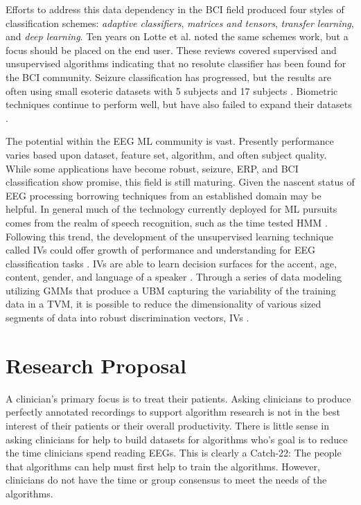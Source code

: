 Efforts to address this data dependency in the \ac{BCI} field produced four styles of classification schemes: \emph{adaptive classifiers}, \emph{matrices and tensors}, \emph{transfer learning}, and \emph{deep learning}\cite{Lotte2007b}. Ten years on Lotte et al. \cite{Lotte2018} noted the same schemes work, but a focus should be placed on the end user. These reviews covered supervised and unsupervised algorithms indicating that no resolute classifier has been found for the \ac{BCI} community. Seizure classification has progressed, but the results are often using small esoteric datasets with 5 subjects \cite{Acharya2018} and 17 subjects \cite{Chu2017}. Biometric techniques continue to perform well, but have also failed to expand their datasets \cite{Abdullah2010,DelPozo-Banos2014a,Yang2016}.

The potential within the \ac{EEG} \ac{ML} community is vast. Presently performance varies based upon dataset, feature set, algorithm, and often subject quality. While some applications have become robust, seizure, \ac{ERP}, and \ac{BCI} classification show promise, this field is still maturing. Given the nascent status of \ac{EEG} processing borrowing techniques from an established domain may be helpful. In general much of the technology currently deployed for \ac{ML} pursuits comes from the realm of speech recognition, such as the time tested \ac{HMM} \cite{Rabiner1989}. Following this trend, the development of the unsupervised learning technique called \acp{IV} could offer growth of performance and understanding for \ac{EEG} classification tasks \cite{Kenny2008b}. \acp{IV} are able to learn decision surfaces for the accent, age, content, gender, and language of a speaker \cite{Behravan2016}. Through a series of data modeling utilizing \acp{GMM} \cite{Reynolds2009} that produce a \ac{UBM} \cite{Hasan2011} capturing the variability of the training data in a \ac{TVM}, it is possible to reduce the dimensionality of various sized segments of data into robust discrimination vectors, \acp{IV} \cite{Dehak2011a}.

\section{Research Proposal}

A clinician's primary focus is to treat their patients. Asking clinicians to produce perfectly annotated recordings to support algorithm research is not in the best interest of their patients or their overall productivity. There is little sense in asking clinicians for help to build datasets for algorithms who's goal is to reduce the time clinicians spend reading \acp{EEG}. This is clearly a Catch-22:  The people that algorithms can help must first help to train the algorithms. However, clinicians do not have the time or group consensus to meet the needs of the algorithms.

